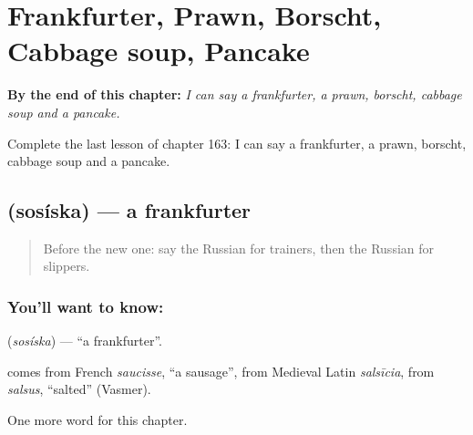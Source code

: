 
\chapter{Frankfurter, Prawn, Borscht, Cabbage soup, Pancake}
\label{ch:ru-frankfurter-prawn-borscht-cabbage-soup-pancake}

\begin{chapteropening}
\textbf{By the end of this chapter:} \emph{I can say a frankfurter, a prawn, borscht, cabbage soup and a pancake.}

Complete the last lesson of chapter 163: I can say a frankfurter, a prawn, borscht, cabbage soup and a pancake.
\end{chapteropening}

\section[\texorpdfstring{\ru{сосиска} (sosíska)}{сосиска (sosíska)}]{ (sosíska) — a frankfurter}

\label{lesson:RU-C163-sosiska}



\begin{quote}
Before the new one: say the Russian for trainers, then the Russian for slippers.
\end{quote}

\subsection*{You'll want to know: }
\textbf{} (\emph{sosíska}) — \textquotedblleft{}a frankfurter\textquotedblright{}.

\begin{cousinweb}
\textbf{} comes from French \emph{saucisse}, \textquotedblleft{}a sausage\textquotedblright{}, from Medieval Latin \emph{salsīcia}, from \emph{salsus}, \textquotedblleft{}salted\textquotedblright{} (Vasmer).
\end{cousinweb}

\begin{grammarlens}[title={What you've built}]
One more word for this chapter.
\end{grammarlens}

